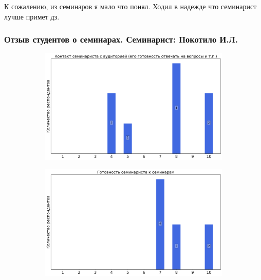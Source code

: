                 \begin{commentbox} 
                    К сожалению, из семинаров я мало что понял. Ходил в надежде что семинарист лучше примет дз. 
                \end{commentbox}


        \subsubsection{Отзыв студентов о семинарах. Семинарист: Покотило И.Л.}
            \begin{figure}[H]
                \centering
                \begin{subfigure}[b]{0.45\textwidth}
                    \centering
                    \includegraphics[width=\textwidth]{images/3 course/Общая физика - квантовая физика/seminarists-marks-Покотило И.Л.-0.png}
                \end{subfigure}
                \begin{subfigure}[b]{0.45\textwidth}
                    \centering
                    \includegraphics[width=\textwidth]{images/3 course/Общая физика - квантовая физика/seminarists-marks-Покотило И.Л.-1.png}

\end{subfigure}
\end{figure}
